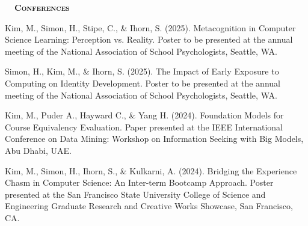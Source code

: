 \documentclass[hidelinks, 10pt]{article}
\def\contentwidth{0.9\linewidth}    %
\def\contentblockspacing{2.5mm}     %
\def\sectionspacing{5mm}            %
\def\sectiontocontentspacing{4mm}   %
\renewcommand{\section}[1]{
    {\fontsize{14}{14}\selectfont \textsc{\textbf{\ \ #1\ \ }}}\hrulefill
}
\begin{document}
\vspace{\sectionspacing}


\section{Conferences}

\vspace{\sectiontocontentspacing}

\begin{minipage}[ct]{\contentwidth}
    Kim, M., Simon, H., Stipe, C., \& Ihorn, S. (2025). Metacognition in Computer Science Learning: Perception vs. Reality. Poster to be presented at the annual meeting of the National Association of School Psychologists, Seattle, WA.
\end{minipage}

\vspace{\contentblockspacing}

\begin{minipage}[ct]{\contentwidth}
    Simon, H., Kim, M., \& Ihorn, S. (2025). The Impact of Early Exposure to Computing on Identity Development. Poster to be presented at the annual meeting of the National Association of School Psychologists, Seattle, WA.
\end{minipage}

\vspace{\contentblockspacing}

\begin{minipage}[ct]{\contentwidth}
    Kim, M., Puder A., Hayward C., \& Yang H. (2024). Foundation Models for Course Equivalency Evaluation. Paper presented at the IEEE International Conference on Data Mining: Workshop on Information Seeking with Big Models, Abu Dhabi, UAE.
\end{minipage}

\vspace{\contentblockspacing}

\begin{minipage}[ct]{\contentwidth}
    Kim, M., Simon, H., Ihorn, S., \& Kulkarni, A. (2024). Bridging the Experience Chasm in Computer Science: An Inter-term Bootcamp Approach. Poster presented at the San Francisco State University College of Science and Engineering Graduate Research and Creative Works Showcase, San Francisco, CA.
\end{minipage}
\end{document}
